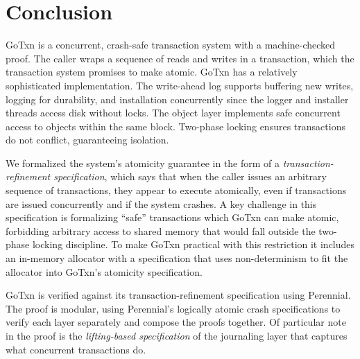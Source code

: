 \section{Conclusion}
\label{sec:txn:concl}

GoTxn is a concurrent, crash-safe transaction system with a machine-checked
proof. The caller wraps a sequence of reads and writes in a transaction, which
the transaction system promises to make atomic. GoTxn has a relatively
sophisticated implementation. The write-ahead log supports buffering new writes,
logging for durability, and installation concurrently since the logger and
installer threads access disk without locks. The object layer implements
safe concurrent access to objects within the same block. Two-phase locking
ensures transactions do not conflict, guaranteeing isolation.

We formalized the system's atomicity guarantee in the form of a
\emph{transaction-refinement specification}, which says that when the caller issues an arbitrary
sequence of transactions, they appear to execute atomically, even if
transactions are issued concurrently and if the system crashes. A key challenge
in this specification is formalizing ``safe'' transactions which GoTxn can make
atomic, forbidding arbitrary access to shared memory that would fall outside the
two-phase locking discipline. To make GoTxn practical with this restriction it
includes an in-memory allocator with a specification that uses non-determinism
to fit the allocator into GoTxn's atomicity specification.

GoTxn is verified against its transaction-refinement specification using Perennial.
The proof is modular, using Perennial's logically atomic crash specifications to
verify each layer separately and compose the proofs together. Of particular note
in the proof is the \emph{lifting-based specification} of the
journaling layer that captures what concurrent transactions do.
